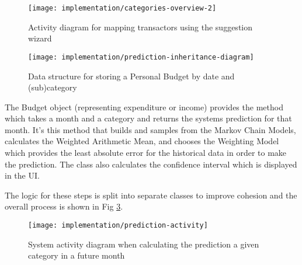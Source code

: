\begin{figure}[h]
    \centering
    \texttt{[image: implementation/categories-overview-2]}
    \caption{Activity diagram for mapping transactors using the suggestion wizard}
    \label{fig:imp-categories-overview}
\end{figure}

\begin{figure}[h]
    \centering
    \texttt{[image: implementation/prediction-inheritance-diagram]}
    \caption{Data structure for storing a Personal Budget by date and (sub)category}
    \label{fig:prediction-inheritance-diagram}
    
    \begin{comment}
[PersonalBudget]<>1-2>[Budget]
[<<Abstract>> CategoryCollection]^-[Budget]
[<<Interface>>;TransactionCollection]^-[Budget]
[<<Abstract>>;CategoryCollection]^-[TransactionDateCollection]
[<<Interface>>;TransactionCollection]^-[TransactionDateCollection]
[Budget]<>1-0..*>[TransactionDateCollection]
[<<Abstract>>;CategoryCollection]^-[TransactionCategoryCollection]
[<<Interface>>;TransactionCollection]^-[TransactionCategoryCollection]
[TransactionDateCollection]<>1-0..*>[TransactionCategoryCollection]
[<<Abstract>>;CategoryCollection]^-[TransactionSubCategoryCollection]
[<<Interface>>;TransactionCollection]^-[TransactionSubCategoryCollection]
[TransactionCategoryCollection]<>1-0..*>[TransactionSubCategoryCollection]
[TransactionSubCategoryCollection]<>1-0..*>[Transaction]
    \end{comment}
\end{figure}

The Budget object (representing expenditure or income) provides the  method which takes a month and a category and returns the systems prediction for that month. It's this method that builds and samples from the Markov Chain Models, calculates the Weighted Arithmetic Mean, and chooses the Weighting Model which provides the least absolute error for the historical data in order to make the prediction. The class also calculates the confidence interval which is displayed in the UI.

The logic for these steps is split into separate classes to improve cohesion and the overall process is shown in Fig \ref{fig:prediction-activity}. 

\begin{figure}[h]
    \centering
    \texttt{[image: implementation/prediction-activity]}
    \caption{System activity diagram when calculating the prediction a given category in a future month}
    \label{fig:prediction-activity}
    
    \begin{comment}
(start)->|a|
|a|->[Markov Chain]->(Build MCMs)->(Sample from MCMs)->|b|
|a|->[Weighted Average Calculator]->(Select Weighting Model)->(Calculate Weighted Averages)->|b|
|b|->[Prediction Evaluator]->(Calculate Average and Confidence)->(end)
    \end{comment}
\end{figure}

